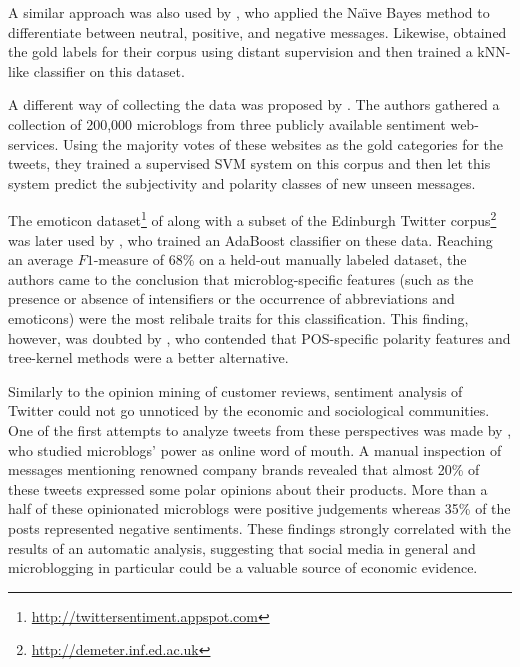 A similar approach was also used by \citet{Pak:10}, who applied the
Na\"{\i}ve Bayes method to differentiate between neutral, positive,
and negative messages.  Likewise, \citet{Davidov:10} obtained the gold
labels for their corpus using distant supervision and then trained a
kNN-like classifier on this dataset.

A different way of collecting the data was proposed by
\citet{Barbosa:10}.  The authors gathered a collection of 200,000
microblogs from three publicly available sentiment web-services.
Using the majority votes of these websites as the gold categories for
the tweets, they trained a supervised SVM system on this corpus and
then let this system predict the subjectivity and polarity classes of
new unseen messages.

The emoticon
dataset\footnote{\url{http://twittersentiment.appspot.com}} of
\citet{Go:09} along with a subset of the Edinburgh Twitter
corpus\footnote{\url{http://demeter.inf.ed.ac.uk}} was later used by
\citet{Kouloumpis:11}, who trained an AdaBoost classifier on these
data.  Reaching an average $F1$-measure of 68\% on a held-out manually
labeled dataset, the authors came to the conclusion that
microblog-specific features (such as the presence or absence of
intensifiers or the occurrence of abbreviations and emoticons) were
the most relibale traits for this classification.  This finding,
however, was doubted by \citet{Agarwal:11}, who contended that
POS-specific polarity features and tree-kernel methods were a better
alternative.

Similarly to the opinion mining of customer reviews, sentiment
analysis of Twitter could not go unnoticed by the economic and
sociological communities.  One of the first attempts to analyze tweets
from these perspectives was made by \citet{Jansen:09}, who studied
microblogs' power as online word of mouth.  A manual inspection of
messages mentioning renowned company brands revealed that almost 20\%
of these tweets expressed some polar opinions about their products.
More than a half of these opinionated microblogs were positive
judgements whereas 35\% of the posts represented negative sentiments.
These findings strongly correlated with the results of an automatic
analysis, suggesting that social media in general and microblogging in
particular could be a valuable source of economic evidence.

